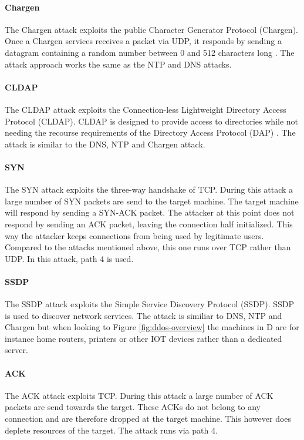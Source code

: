 \paragraph{Chargen}
The Chargen attack exploits the public Character Generator Protocol (Chargen). Once a Chargen services receives a packet via UDP, it responds by sending a datagram containing a random number between 0 and 512 characters long \cite{ietf1983}. The attack approach works the same as the NTP and DNS attacks.  

\paragraph{CLDAP}
The CLDAP attack exploits the Connection-less Lightweight Directory Access Protocol (CLDAP). CLDAP is designed to provide access to directories while not needing the recourse requirements of the Directory Access Protocol (DAP) \cite{ietf1995}. The attack is similar to the DNS, NTP and Chargen attack. 

\paragraph{SYN}
The SYN attack exploits the three-way handshake of TCP. During this attack a large number of SYN packets are send to the target machine. The target machine will respond by sending a SYN-ACK packet. The attacker at this point does not respond by sending an ACK packet, leaving the connection half initialized. This way the attacker keeps connections from being used by legitimate users. Compared to the attacks mentioned above, this one runs over TCP rather than UDP. In this attack, path 4 is used. 

\paragraph{SSDP}
The SSDP attack exploits the Simple Service Discovery Protocol (SSDP). SSDP is used to discover network services. The attack is similiar to DNS, NTP and Chargen but when looking to Figure \ref{fig:ddos-overview} the machines in D are for instance home routers, printers or other IOT devices rather than a dedicated server. 


\paragraph{ACK}
The ACK attack exploits TCP. During this attack a large number of ACK packets are send towards the target. These ACKs do not belong to any connection and are therefore dropped at the target machine. This however does deplete resources of the target. The attack runs via path 4.  


